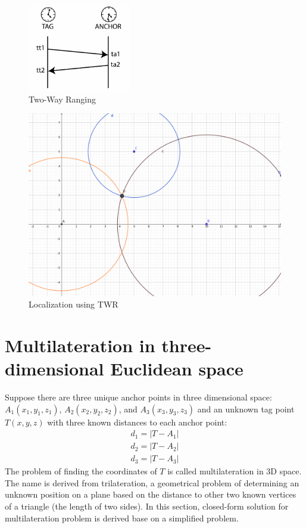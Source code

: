\documentclass[\main/main.tex]{subfiles}
\begin{document}
\begin{figure}[H]
    \centering
    \includegraphics[width=0.4\textwidth]{twr_protocol.png}
    \caption{Two-Way Ranging}
    \label{fig:twr_anchor_and_tag}
\end{figure}

\begin{figure}[H]
    \centering
    \includegraphics[width=1\textwidth]{twr.png}
    \caption{Localization using TWR}
    \label{fig:twr_trilateration}
\end{figure}

\section{Multilateration in three-dimensional Euclidean space}
\label{sec:localization_using_multilateration}

Suppose there are three unique anchor points in three dimensional space: $A_1(x_1, y_1,z_1)$, $A_2(x_2, y_2,z_2)$,
and $A_3(x_3, y_3,z_3)$ and an unknown tag point $T(x,y,z)$ with three known distances to each anchor point:
\begin{equation}
    \begin{split}
        d_1 = | T - A_1| \\
        d_2 = | T - A_2| \\
        d_3 = | T - A_3|
    \end{split}
\end{equation}
The problem of finding the coordinates of $T$ is called multilateration in 3D space. The name is derived from trilateration, a  geometrical problem of determining an unknown position on a plane based on the distance to other two known vertices of a triangle (the length of two sides). In this section, closed-form solution for multilateration problem is derived base on a simplified problem.
\end{document}
